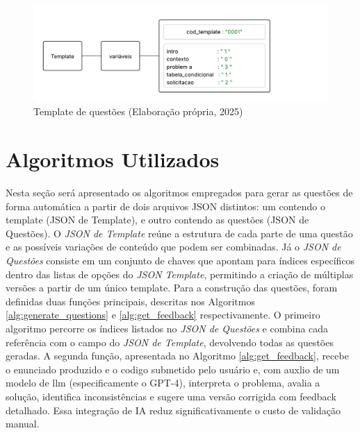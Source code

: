 \begin{figure}[ht]
	\centering
	\includegraphics[width=18cm]{./imagens/capitulo5/template-2}
	\caption{Template de questões (Elaboração própria, 2025) }
	\label{fig:template-2}
\end{figure}

\section{Algoritmos Utilizados}

Nesta seção será apresentado os algoritmos empregados para gerar as questões de forma automática a partir de dois arquivos JSON distintos: um contendo o template (JSON de Template), e outro contendo as questões (JSON de Questões). O \textit{JSON de Template} reúne a estrutura de cada parte de uma questão e as possíveis variações de conteúdo que podem ser combinadas. Já o \textit{JSON de Questões} consiste em um conjunto de chaves que apontam para índices específicos dentro das listas de opções do \textit{JSON Template}, permitindo a criação de múltiplas versões a partir de um único template. 
Para a construção das questões, foram definidas duas funções principais, descritas nos Algoritmos \ref{alg:generate_questions} e \ref{alg:get_feedback}  respectivamente.   
O primeiro algoritmo percorre os índices listados no \textit{JSON de Questões} e combina cada referência com o campo do \textit{JSON de Template}, devolvendo todas as questões geradas.  
A segunda função, apresentada no Algoritmo \ref{alg:get_feedback}, recebe o enunciado produzido e o codigo submetido pelo usuário e, com auxlio de um modelo de \gls{llm} (especificamente o GPT-4), interpreta o problema, avalia a solução, identifica inconsistências e sugere uma versão corrigida com feedback detalhado. Essa integração de IA reduz significativamente o custo de validação manual.

